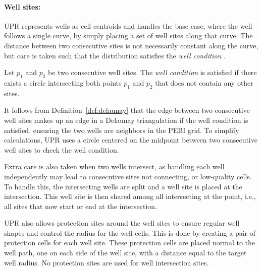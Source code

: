 \paragraph{Well sites:}
\label{UPR:wells}
UPR represents wells as cell centroids and handles the base case, where the well follows a single curve, by simply placing a set of well sites along that curve. The distance between two consecutive sites is not necessarily constant along the curve, but care is taken such that the distribution satisfies the \emph{well condition} \cite[pp.42]{UPR_thesis}.

\begin{definition}
Let $p_1$ and $p_2$ be two consecutive well sites. The \emph{well condition} is satisfied if there exists a circle intersecting both points $p_1$ and $p_2$ that does not contain any other sites.
\end{definition}

It follows from Definition~\ref{def:delaunay} that the edge between two consecutive well sites makes up an edge in a Delaunay triangulation if the well condition is satisfied, ensuring the two wells are neighbors in the PEBI grid. To simplify calculations, UPR uses a circle centered on the midpoint between two consecutive well sites to check the well condition.

Extra care is also taken when two wells intersect, as handling each well independently may lead to consecutive sites not connecting, or low-quality cells. To handle this, the intersecting wells are split and a well site is placed at the intersection. This well site is then shared among all intersecting at the point, i.e., all sites that now start or end at the intersection. 

UPR also allows protection sites around the well sites to ensure regular well shapes and control the radius for the well cells. This is done by creating a pair of protection cells for each well site. These protection cells are placed normal to the well path, one on each side of the well site, with a distance equal to the target well radius. No protection sites are used for well intersection sites.

